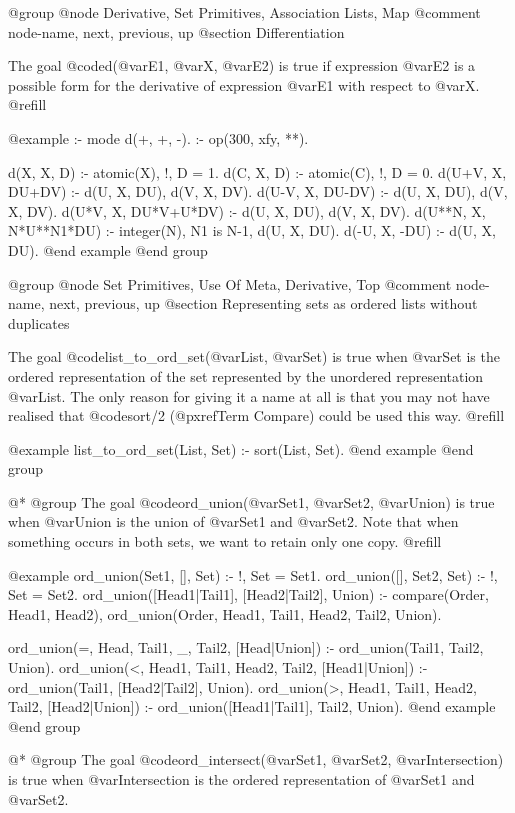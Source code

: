 {{{{{@group
@node Derivative, Set Primitives, Association Lists, Map
@comment  node-name,  next,  previous,  up
@section Differentiation

The goal @code{d(@var{E1}, @var{X}, @var{E2})} is true if expression @var{E2}
is a possible form for the derivative of expression @var{E1} with respect
to @var{X}. @refill

@example
:- mode d(+, +, -).
:- op(300, xfy, **).

d(X, X, D) :- atomic(X), !, D = 1.
d(C, X, D) :- atomic(C), !, D = 0.
d(U+V, X, DU+DV) :- d(U, X, DU), d(V, X, DV).
d(U-V, X, DU-DV) :- d(U, X, DU), d(V, X, DV).
d(U*V, X, DU*V+U*DV) :- d(U, X, DU), d(V, X, DV).
d(U**N, X, N*U**N1*DU) :- integer(N), N1 is N-1, d(U, X, DU).
d(-U, X, -DU) :- d(U, X, DU).
@end example
@end group

@group
@node Set Primitives, Use Of Meta, Derivative, Top
@comment  node-name,  next,  previous,  up
@section Representing sets as ordered lists without duplicates

The goal @code{list_to_ord_set(@var{List}, @var{Set})} is true when
@var{Set} is the ordered representation of the set represented by the
unordered representation @var{List}.  The only reason for giving it a
name at all is that you may not have realised that @code{sort/2}
(@pxref{Term Compare}) could be used this way. @refill
 
@example
list_to_ord_set(List, Set) :-
        sort(List, Set).
@end example
@end group

 @*
@group
The goal @code{ord_union(@var{Set1}, @var{Set2}, @var{Union})} is true
when @var{Union} is the union of @var{Set1} and @var{Set2}.  Note that
when something occurs in both sets, we want to retain only one copy. @refill

@example
ord_union(Set1, [], Set) :- !, Set = Set1.
ord_union([], Set2, Set) :- !, Set = Set2.
ord_union([Head1|Tail1], [Head2|Tail2], Union) :-
        compare(Order, Head1, Head2),
        ord_union(Order, Head1, Tail1, Head2, Tail2, Union).
 
ord_union(=, Head,  Tail1, _,     Tail2, [Head|Union]) :-
        ord_union(Tail1, Tail2, Union).
ord_union(<, Head1, Tail1, Head2, Tail2, [Head1|Union]) :-
        ord_union(Tail1, [Head2|Tail2], Union).
ord_union(>, Head1, Tail1, Head2, Tail2, [Head2|Union]) :-
        ord_union([Head1|Tail1], Tail2, Union).
@end example
@end group
 
 @*
@group
The goal @code{ord_intersect(@var{Set1}, @var{Set2}, @var{Intersection})}
is true when @var{Intersection} is the ordered representation of @var{Set1}
and @var{Set2}.

}}}}}
